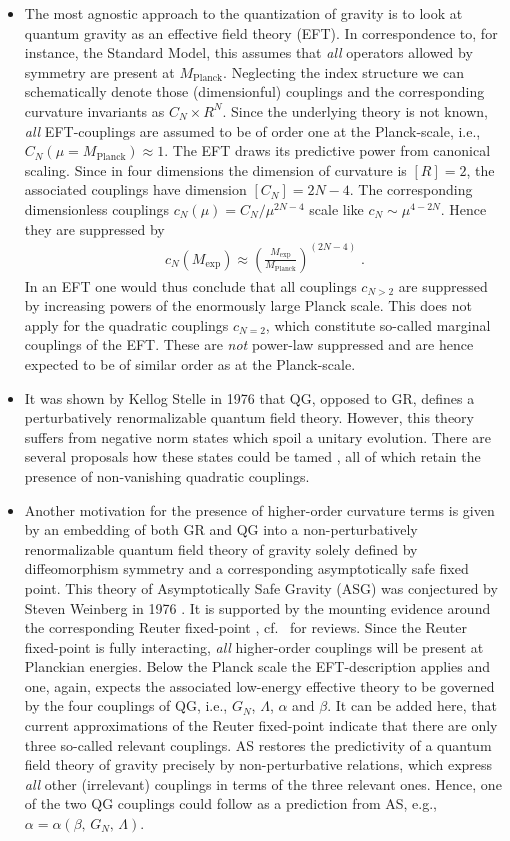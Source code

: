\documentclass[a4paper,oneside,openany,11pt]{memoir}
\numberwithin{equation}{section} %
\begin{document}
\begin{itemize}
    \item
    The most agnostic approach to the quantization of gravity is to look at quantum gravity as an effective field theory (EFT). In correspondence to, for instance, the Standard Model, this assumes that \emph{all} operators allowed by symmetry are present at $M_\text{Planck}$. Neglecting the index structure we can schematically denote those (dimensionful) couplings and the corresponding curvature invariants as $C_N\times R^N$. Since the underlying theory is not known, \emph{all} EFT-couplings are assumed to be of order one at the Planck-scale, i.e., $C_N(\mu=M_\text{Planck})\approx 1$. The EFT draws its predictive power from canonical scaling. Since in four dimensions the dimension of curvature is $[R]=2$, the associated couplings have dimension $[C_N] = 2N - 4$. The corresponding dimensionless couplings $c_N(\mu) = C_N / \mu^{2N-4}$ scale like $c_N \sim \mu^{4-2N}$. Hence they are suppressed by
\begin{align}
    c_N(M_\text{exp}) \approx \left(\frac{M_\text{exp}}{M_\text{Planck}}\right)^{(2N-4)}\;.
\end{align}
    In an EFT one would thus conclude that all couplings $c_{N>2}$ are suppressed by increasing powers of the enormously large Planck scale. This does not apply for the quadratic couplings $c_{N=2}$, which constitute so-called marginal couplings of the EFT. These are \emph{not} power-law suppressed and are hence expected to be of similar order as at the Planck-scale.
    \item
    It was shown by Kellog Stelle in 1976 \cite{Stelle:1976gc} that QG, opposed to GR, defines a perturbatively renormalizable quantum field theory. However, this theory suffers from negative norm states which spoil a unitary evolution. There are several proposals how these states could be tamed \cite{}, all of which retain the presence of non-vanishing quadratic couplings.
    \item
    Another motivation for the presence of higher-order curvature terms is given by an embedding of both GR and QG into a non-perturbatively renormalizable quantum field theory of gravity solely defined by diffeomorphism symmetry and a corresponding asymptotically safe fixed point. This theory of Asymptotically Safe Gravity (ASG) was conjectured by Steven Weinberg in 1976 \cite{Weinberg:1980gg}.  It is supported by the mounting evidence around the corresponding Reuter fixed-point \cite{Reuter:1996cp}, cf.~\cite{} for reviews. Since the Reuter fixed-point is fully interacting, \emph{all} higher-order couplings will be present at Planckian energies. Below the Planck scale the EFT-description applies and one, again, expects the associated low-energy effective theory to be governed by the four couplings of QG, i.e., $G_N$, $\Lambda$, $\alpha$ and $\beta$. It can be added here, that current approximations of the Reuter fixed-point indicate that there are only three so-called relevant couplings. AS restores the predictivity of a quantum field theory of gravity precisely by non-perturbative relations, which express \emph{all} other (irrelevant) couplings in terms of the three relevant ones. Hence, one of the two QG couplings could follow as a prediction from AS, e.g., $\alpha = \alpha (\beta,\,G_N,\,\Lambda)$.

\end{itemize}
\end{document}
